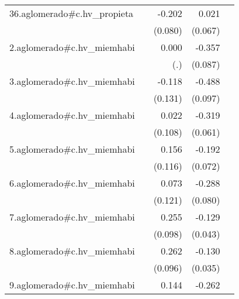{\begin{longtable}{l*{4}{D{.}{.}{-1}}}
\addlinespace
36.aglomerado#c.hv\_propieta&                     &      -0.202\sym{*}  &       0.021         &                     \\
            &                     &     (0.080)         &     (0.067)         &                     \\
\addlinespace
2.aglomerado#c.hv\_miemhabi&                     &       0.000         &      -0.357\sym{***}&                     \\
            &                     &         (.)         &     (0.087)         &                     \\
\addlinespace
3.aglomerado#c.hv\_miemhabi&                     &      -0.118         &      -0.488\sym{***}&                     \\
            &                     &     (0.131)         &     (0.097)         &                     \\
\addlinespace
4.aglomerado#c.hv\_miemhabi&                     &       0.022         &      -0.319\sym{***}&                     \\
            &                     &     (0.108)         &     (0.061)         &                     \\
\addlinespace
5.aglomerado#c.hv\_miemhabi&                     &       0.156         &      -0.192\sym{**} &                     \\
            &                     &     (0.116)         &     (0.072)         &                     \\
\addlinespace
6.aglomerado#c.hv\_miemhabi&                     &       0.073         &      -0.288\sym{***}&                     \\
            &                     &     (0.121)         &     (0.080)         &                     \\
\addlinespace
7.aglomerado#c.hv\_miemhabi&                     &       0.255\sym{**} &      -0.129\sym{**} &                     \\
            &                     &     (0.098)         &     (0.043)         &                     \\
\addlinespace
8.aglomerado#c.hv\_miemhabi&                     &       0.262\sym{**} &      -0.130\sym{***}&                     \\
            &                     &     (0.096)         &     (0.035)         &                     \\
\addlinespace
9.aglomerado#c.hv\_miemhabi&                     &       0.144         &      -0.262\sym{***}&                     \\

\end{longtable}}
